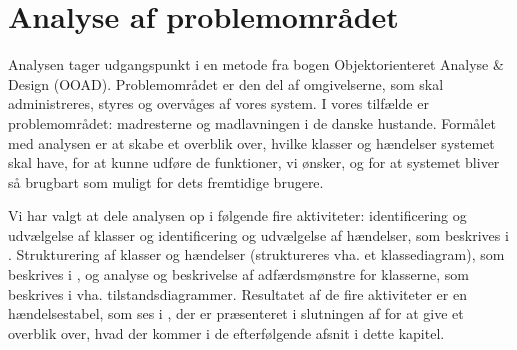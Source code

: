 \chapter{Analyse af problemområdet}
\label{chap:analyseafpo}

Analysen tager udgangspunkt i en metode fra bogen Objektorienteret Analyse \& Design (OOAD)\cite[s. ~43]{ooad}. Problemområdet er den del af omgivelserne, som skal administreres, styres og overvåges af vores system. I vores tilfælde er problemområdet: madresterne og madlavningen i de danske hustande. Formålet med analysen er at skabe et overblik over, hvilke klasser og hændelser systemet skal have, for at kunne udføre de funktioner, vi ønsker, og for at systemet bliver så brugbart som muligt for dets fremtidige brugere. 

Vi har valgt at dele analysen op i følgende fire aktiviteter: identificering og udvælgelse af klasser og identificering og udvælgelse af hændelser, som beskrives i . Strukturering af klasser og hændelser (struktureres vha. et klassediagram), som beskrives i , og analyse og beskrivelse af adfærdsmønstre for klasserne, som beskrives i  vha. tilstandsdiagrammer. Resultatet af de fire aktiviteter er en hændelsestabel, som ses i , der er præsenteret i slutningen af  for at give et overblik over, hvad der kommer i de efterfølgende afsnit i dette kapitel.

 
            
 
       

